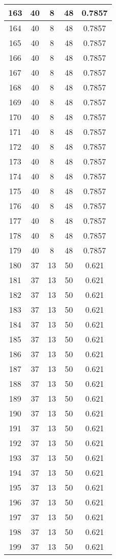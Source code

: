 \documentclass[letterpaper, 12pt]{article}
\begin{document}
\begin{longtable}{|c|c|c|c|c|}
\hline
163 & 40 & 8 & 48 & 0.7857 \\
\hline
164 & 40 & 8 & 48 & 0.7857 \\
\hline
165 & 40 & 8 & 48 & 0.7857 \\
\hline
166 & 40 & 8 & 48 & 0.7857 \\
\hline
167 & 40 & 8 & 48 & 0.7857 \\
\hline
168 & 40 & 8 & 48 & 0.7857 \\
\hline
169 & 40 & 8 & 48 & 0.7857 \\
\hline
170 & 40 & 8 & 48 & 0.7857 \\
\hline
171 & 40 & 8 & 48 & 0.7857 \\
\hline
172 & 40 & 8 & 48 & 0.7857 \\
\hline
173 & 40 & 8 & 48 & 0.7857 \\
\hline
174 & 40 & 8 & 48 & 0.7857 \\
\hline
175 & 40 & 8 & 48 & 0.7857 \\
\hline
176 & 40 & 8 & 48 & 0.7857 \\
\hline
177 & 40 & 8 & 48 & 0.7857 \\
\hline
178 & 40 & 8 & 48 & 0.7857 \\
\hline
179 & 40 & 8 & 48 & 0.7857 \\
\hline
180 & 37 & 13 & 50 & 0.621 \\
\hline
181 & 37 & 13 & 50 & 0.621 \\
\hline
182 & 37 & 13 & 50 & 0.621 \\
\hline
183 & 37 & 13 & 50 & 0.621 \\
\hline
184 & 37 & 13 & 50 & 0.621 \\
\hline
185 & 37 & 13 & 50 & 0.621 \\
\hline
186 & 37 & 13 & 50 & 0.621 \\
\hline
187 & 37 & 13 & 50 & 0.621 \\
\hline
188 & 37 & 13 & 50 & 0.621 \\
\hline
189 & 37 & 13 & 50 & 0.621 \\
\hline
190 & 37 & 13 & 50 & 0.621 \\
\hline
191 & 37 & 13 & 50 & 0.621 \\
\hline
192 & 37 & 13 & 50 & 0.621 \\
\hline
193 & 37 & 13 & 50 & 0.621 \\
\hline
194 & 37 & 13 & 50 & 0.621 \\
\hline
195 & 37 & 13 & 50 & 0.621 \\
\hline
196 & 37 & 13 & 50 & 0.621 \\
\hline
197 & 37 & 13 & 50 & 0.621 \\
\hline
198 & 37 & 13 & 50 & 0.621 \\
\hline
199 & 37 & 13 & 50 & 0.621 \\
\hline
\end{longtable}
\end{document}
